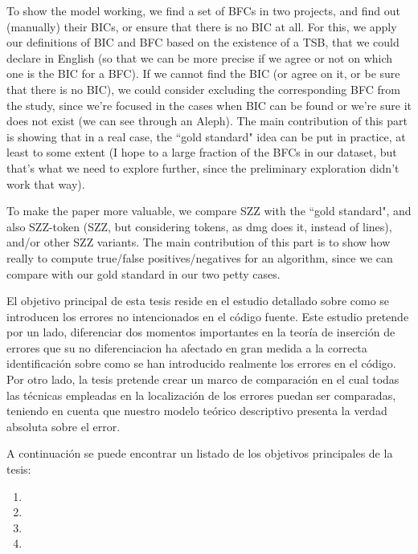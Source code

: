 \documentclass[a4paper, 12pt]{book}
\begin{document}
To show the model working, we find a set of BFCs in two projects, and find out (manually) their BICs, or ensure that there is no BIC at all. For this, we apply our definitions of BIC and BFC based on the existence of a TSB, that we could declare in English (so that we can be more precise if we agree or not on which one is the BIC for a BFC). If we cannot find the BIC (or agree on it, or be sure that there is no BIC), we could consider excluding the corresponding BFC from the study, since we're focused in the cases when BIC can be found or we're sure it does not exist (we can see through an Aleph). The main contribution of this part is showing that in a real case, the ``gold standard" idea can be put in practice, at least to some extent (I hope to a large fraction of the BFCs in our dataset, but that's what we need to explore further, since the preliminary exploration didn't work that way).

To make the paper more valuable, we compare SZZ with the ``gold standard", and also SZZ-token (SZZ, but considering tokens, as dmg does it, instead of lines), and/or other SZZ variants. The main contribution of this part is to show how really to compute true/false positives/negatives for an algorithm, since we can compare with our gold standard in our two petty cases.




El objetivo principal de esta tesis reside en el estudio detallado sobre como se introducen los errores no intencionados en el c\'odigo fuente. Este estudio pretende por un lado, diferenciar dos momentos importantes en la teor\'ia de inserci\'on de errores que su no diferenciacion ha afectado en gran medida a la correcta identificaci\'on sobre como se han introducido realmente los errores en el c\'odigo. Por otro lado, la tesis pretende crear un marco de comparaci\'on en el cual todas las t\'ecnicas empleadas en la localizaci\'on de los errores puedan ser comparadas, teniendo en cuenta que nuestro modelo te\'orico descriptivo presenta la verdad absoluta sobre el error.

A continuaci\'on se puede encontrar un listado de los objetivos principales de la tesis:

\begin{enumerate}
  \item{}
  \item{}
  \item{}
  \item{}
\end{enumerate}
\end{document}
